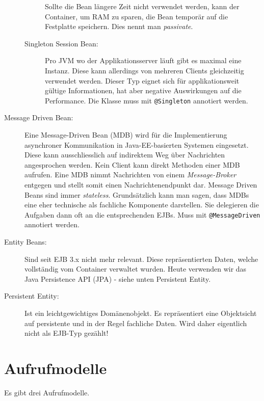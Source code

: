 \begin{description}
\begin{description}
			Sollte die Bean längere Zeit nicht verwendet werden, kann der Container, um RAM zu sparen, die Bean temporär auf die Festplatte speichern. Dies nennt man \textit{passivate}.
			
			\item[Singleton Session Bean:] Pro JVM wo der Applikationsserver läuft gibt es maximal eine Instanz. Diese kann allerdings von mehreren Clients gleichzeitig verwendet werden. Dieser Typ eignet sich für applikationsweit gültige Informationen, hat aber negative Auswirkungen auf die Performance. Die Klasse muss mit \verb|@Singleton| annotiert werden.
		\end{description}
	
	\item[Message Driven Bean:] Eine Message-Driven Bean (MDB) wird für die Implementierung asynchroner Kommunikation in Java-EE-basierten Systemen eingesetzt. Diese kann ausschliesslich auf indirektem Weg über Nachrichten angesprochen werden. Kein Client kann direkt Methoden einer MDB aufrufen. Eine MDB nimmt Nachrichten von einem \emph{Message-Broker} entgegen und stellt somit einen Nachrichtenendpunkt dar. Message Driven Beans sind immer \emph{stateless}. Grundsätzlich kann man sagen, dass MDBs eine eher technische als fachliche Komponente darstellen. Sie delegieren die Aufgaben dann oft an die entsprechenden EJBs. Muss mit \verb|@MessageDriven| annotiert werden.
	
	\item[Entity Beans:] Sind seit EJB 3.x nicht mehr relevant. Diese repräsentierten Daten, welche vollständig vom Container verwaltet wurden. Heute verwenden wir das Java Persistence API (JPA) - siehe unten Persistent Entity.
		
	\item[Persistent Entity:] Ist ein leichtgewichtiges Domänenobjekt. Es repräsentiert eine Objektsicht auf persistente und in der Regel fachliche Daten. Wird daher eigentlich nicht als EJB-Typ gezählt!
\end{description}

\section{Aufrufmodelle}
Es gibt drei Aufrufmodelle.


